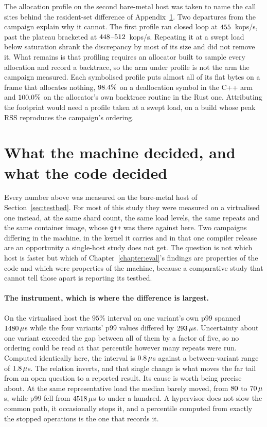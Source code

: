 \documentclass[english,oneside,a4paper,censored,csm,software-track-2020]{HYthesisML}
\begin{document}
\begin{appendices}
The allocation profile on the second bare-metal host was taken to name the call sites behind
the resident-set difference of Appendix~\ref{sec:hostcompare}. Two departures from the campaign
explain why it cannot. The first profile ran closed loop at $455$~kops/s, past the
plateau bracketed at $448$--$512$~kops/s. Repeating it at a swept load below saturation
shrank the discrepancy by most of its size and did not remove it. What remains is that
profiling requires an allocator built to sample every allocation and record a backtrace, so the
arm under profile is not the arm the campaign measured. Each symbolised profile puts almost all
of its flat bytes on a frame that allocates nothing, $98.4\%$ on a deallocation
symbol in the C++ arm and $100.0\%$ on the allocator's own backtrace routine in the
Rust one. Attributing the footprint would need a profile taken at a swept load, on a build
whose peak RSS reproduces the campaign's ordering.

\section{What the machine decided, and what the code decided}\label{sec:hostcompare}
\label{sec:baremetal}%
Every number above was measured on the bare-metal host of Section~\ref{sec:testbed}. For most of
this study they were measured on a virtualised one instead, at the same shard count, the same
\GuestLoadLevels{} load levels, the same \GuestRepeats{} repeats and the same container image,
whose \texttt{g++} was \texttt{\GuestGpp} there against \texttt{\MainGpp} here. Two campaigns
differing in the machine, in the kernel it carries and in that one compiler release are an
opportunity a single-host study does not get. The question is not which host is faster but which
of Chapter~\ref{chapter:eval}'s findings are properties of the code and which were properties of
the machine, because a comparative study that cannot tell those apart is reporting its testbed.

\paragraph{The instrument, which is where the difference is largest.}
On the virtualised host the $95\%$ interval on one variant's own p99 spanned
$1480\,\mu$s while the four variants' p99 values differed by
$293\,\mu$s. Uncertainty about one variant exceeded the gap between all of them by
a factor of five, so no ordering could be read at that percentile however many repeats were run.
Computed identically here, the interval is $0.8\,\mu$s against a between-variant range
of $1.8\,\mu$s. The relation inverts, and that single change is what moves the far
tail from an open question to a reported result. Its cause is worth being precise about. At the
same representative load the median barely moved, from $80$ to $70\,\mu$s,
while p99 fell from $4518\,\mu$s to under a hundred. A hypervisor does not slow the
common path, it occasionally stops it, and a percentile computed from exactly the stopped
operations is the one that records it.


\end{appendices}
\end{document}

